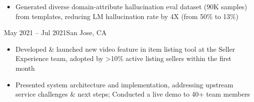 \begin{itemize}

    \item Generated
    diverse
    domain-attribute
    hallucination 
    eval dataset (90K samples)
    from templates,
    reducing LM hallucination rate by 4X (from 50\% to 13\%)



\end{itemize}
\dividerSmall


    {}
    {May 2021 -- Jul 2021}{San Jose, CA}{}
\begin{itemize}

    \item Developed \& launched new video feature in item listing tool at the Seller Experience team,
    adopted by >10\% active listing sellers within the first month

    \item Presented system architecture and implementation, addressing upstream service challenges \& next steps;
    Conducted a live demo to 40+ team members \hspace{-0.5em}
\end{itemize}
\dividerSmall


